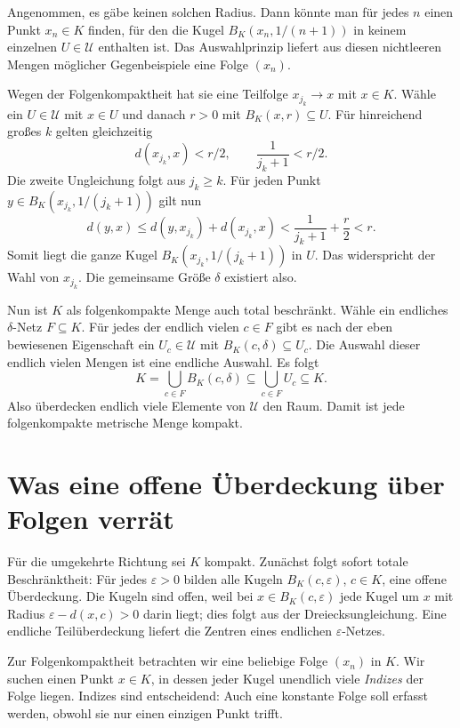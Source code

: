 Angenommen, es gäbe keinen solchen Radius. Dann könnte man für
jedes \(n\) einen Punkt \(x_n\in K\) finden, für den die
Kugel \(B_K(x_n,1/(n+1))\) in keinem einzelnen
\(U\in\mathcal U\) enthalten ist. Das Auswahlprinzip liefert
aus diesen nichtleeren Mengen möglicher Gegenbeispiele eine
Folge \((x_n)\).

Wegen der Folgenkompaktheit hat sie eine Teilfolge
\(x_{j_k}\to x\) mit \(x\in K\). Wähle ein
\(U\in\mathcal U\) mit \(x\in U\) und danach \(r>0\)
mit \(B_K(x,r)\subseteq U\). Für hinreichend großes \(k\)
gelten gleichzeitig
\[
 d(x_{j_k},x)<r/2,
 \qquad \frac1{j_k+1}<r/2.
\]
Die zweite Ungleichung folgt aus \(j_k\geq k\). Für jeden
Punkt \(y\in B_K(x_{j_k},1/(j_k+1))\) gilt nun
\[
 d(y,x)\leq d(y,x_{j_k})+d(x_{j_k},x)
         <\frac1{j_k+1}+\frac r2<r.
\]
Somit liegt die ganze Kugel
\(B_K(x_{j_k},1/(j_k+1))\) in \(U\). Das widerspricht
der Wahl von \(x_{j_k}\). Die gemeinsame Größe \(\delta\)
existiert also.

Nun ist \(K\) als folgenkompakte Menge auch total beschränkt.
Wähle ein endliches \(\delta\)-Netz \(F\subseteq K\).
Für jedes der endlich vielen \(c\in F\) gibt es nach der
eben bewiesenen Eigenschaft ein \(U_c\in\mathcal U\) mit
\(B_K(c,\delta)\subseteq U_c\). Die Auswahl dieser endlich
vielen Mengen ist eine endliche Auswahl. Es folgt
\[
 K=\bigcup_{c\in F}B_K(c,\delta)
   \subseteq\bigcup_{c\in F}U_c\subseteq K.
\]
Also überdecken endlich viele Elemente von \(\mathcal U\)
den Raum. Damit ist jede folgenkompakte metrische Menge kompakt.

\section*{Was eine offene Überdeckung über Folgen verrät}

Für die umgekehrte Richtung sei \(K\) kompakt. Zunächst folgt
sofort totale Beschränktheit: Für jedes \(\varepsilon>0\)
bilden alle Kugeln \(B_K(c,\varepsilon)\), \(c\in K\),
eine offene Überdeckung. Die Kugeln sind offen, weil bei
\(x\in B_K(c,\varepsilon)\) jede Kugel um \(x\) mit Radius
\(\varepsilon-d(x,c)>0\) darin liegt; dies folgt aus der
Dreiecksungleichung. Eine endliche Teilüberdeckung liefert
die Zentren eines endlichen \(\varepsilon\)-Netzes.

Zur Folgenkompaktheit betrachten wir eine beliebige Folge
\((x_n)\) in \(K\). Wir suchen einen Punkt \(x\in K\),
in dessen jeder Kugel unendlich viele \emph{Indizes} der Folge
liegen. Indizes sind entscheidend: Auch eine konstante Folge
soll erfasst werden, obwohl sie nur einen einzigen Punkt trifft.

